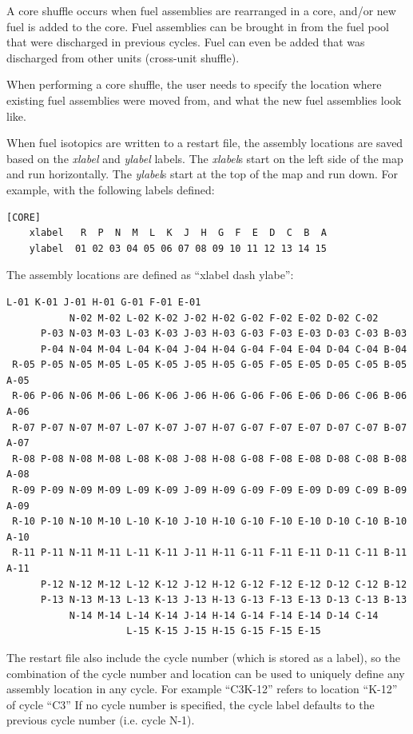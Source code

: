 A core shuffle occurs when fuel assemblies are rearranged in a core, and/or new fuel is added to the core.
Fuel assemblies can be brought in from the fuel pool that were discharged in previous cycles.
Fuel can even be added that was discharged from other units (cross-unit shuffle).

When performing a core shuffle, the user needs to specify the location where existing fuel assemblies were moved from,
and what the new fuel assemblies look like.

When fuel isotopics are written to a restart file, the assembly locations are saved
based on the {\it xlabel} and {\it ylabel} labels.
The {\it xlabel}s start on the left side of the map and run horizontally.
The {\it ylabel}s start at the top of the map and run down.
For example, with the following labels defined:
\begin{Verbatim}[fontsize=\small]
  [CORE]
    xlabel   R  P  N  M  L  K  J  H  G  F  E  D  C  B  A
    ylabel  01 02 03 04 05 06 07 08 09 10 11 12 13 14 15
\end{Verbatim}
The assembly locations are defined as ``xlabel dash ylabe'':
\begin{Verbatim}[fontsize=\small]
                     L-01 K-01 J-01 H-01 G-01 F-01 E-01
           N-02 M-02 L-02 K-02 J-02 H-02 G-02 F-02 E-02 D-02 C-02
      P-03 N-03 M-03 L-03 K-03 J-03 H-03 G-03 F-03 E-03 D-03 C-03 B-03
      P-04 N-04 M-04 L-04 K-04 J-04 H-04 G-04 F-04 E-04 D-04 C-04 B-04
 R-05 P-05 N-05 M-05 L-05 K-05 J-05 H-05 G-05 F-05 E-05 D-05 C-05 B-05 A-05
 R-06 P-06 N-06 M-06 L-06 K-06 J-06 H-06 G-06 F-06 E-06 D-06 C-06 B-06 A-06
 R-07 P-07 N-07 M-07 L-07 K-07 J-07 H-07 G-07 F-07 E-07 D-07 C-07 B-07 A-07
 R-08 P-08 N-08 M-08 L-08 K-08 J-08 H-08 G-08 F-08 E-08 D-08 C-08 B-08 A-08
 R-09 P-09 N-09 M-09 L-09 K-09 J-09 H-09 G-09 F-09 E-09 D-09 C-09 B-09 A-09
 R-10 P-10 N-10 M-10 L-10 K-10 J-10 H-10 G-10 F-10 E-10 D-10 C-10 B-10 A-10
 R-11 P-11 N-11 M-11 L-11 K-11 J-11 H-11 G-11 F-11 E-11 D-11 C-11 B-11 A-11
      P-12 N-12 M-12 L-12 K-12 J-12 H-12 G-12 F-12 E-12 D-12 C-12 B-12
      P-13 N-13 M-13 L-13 K-13 J-13 H-13 G-13 F-13 E-13 D-13 C-13 B-13
           N-14 M-14 L-14 K-14 J-14 H-14 G-14 F-14 E-14 D-14 C-14
                     L-15 K-15 J-15 H-15 G-15 F-15 E-15
\end{Verbatim}
The restart file also include the cycle number (which is stored as a label),
so the combination of the cycle number and location can be used to uniquely define any assembly location in any cycle.
For example ``C3K-12'' refers to location ``K-12'' of cycle ``C3''
If no cycle number is specified, the cycle label defaults to the previous cycle number (i.e. cycle N-1).

